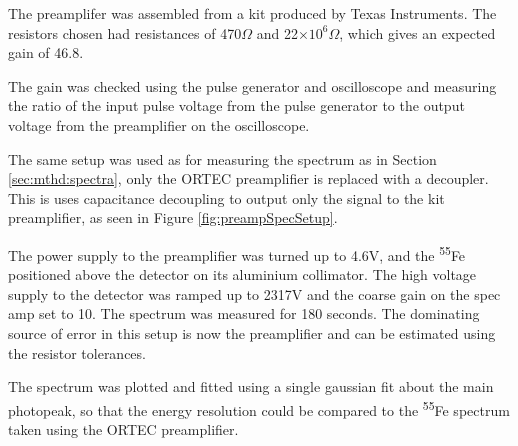 The preamplifer was assembled from a kit produced by Texas Instruments. The resistors chosen had resistances of 470$\Omega$ and 22$\times10^{6}\Omega$, which gives an expected gain of 46.8.

The gain was checked using the pulse generator and oscilloscope and measuring the ratio of the input pulse voltage from the pulse generator to the output voltage from the preamplifier on the oscilloscope.

The same setup was used as for measuring the spectrum as in Section \ref{sec:mthd:spectra}, only the ORTEC preamplifier is replaced with a decoupler. This is uses capacitance decoupling to output only the signal to the kit preamplifier, as seen in Figure \ref{fig:preampSpecSetup}.

The power supply to the preamplifier was turned up to 4.6V, and the \textsuperscript{55}Fe positioned above the detector on its aluminium collimator. The high voltage supply to the detector was ramped up to 2317V and the coarse gain on the spec amp set to 10. The spectrum was measured for 180 seconds. The dominating source of error in this setup is now the preamplifier and can be estimated using the resistor tolerances.

The spectrum was plotted and fitted using a single gaussian fit about the main photopeak, so that the energy resolution could be compared to the \textsuperscript{55}Fe spectrum taken using the ORTEC preamplifier.